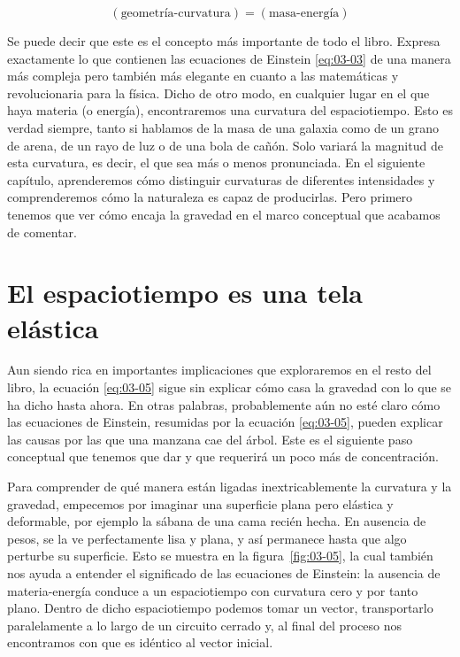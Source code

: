 \begin{equation}\label{eq:03-05}
(\text{geometría-curvatura}) = (\text{masa-energía})
\end{equation}


Se puede decir que este es el concepto más importante de todo el libro. Expresa exactamente lo
que contienen las ecuaciones de Einstein \eqref{eq:03-03} de una manera más compleja pero
también más elegante en cuanto a las matemáticas y revolucionaria para la física. Dicho de otro
modo, en cualquier lugar en el que haya materia (o energía), encontraremos una curvatura del
espaciotiempo. Esto es verdad siempre, tanto si hablamos de la masa de una galaxia como de un
grano de arena, de un rayo de luz o de una bola de cañón. Solo variará la magnitud de esta
curvatura, es decir, el que sea más o menos pronunciada. En el siguiente capítulo, aprenderemos
cómo distinguir curvaturas de diferentes intensidades y comprenderemos cómo la naturaleza es
capaz de producirlas. Pero primero tenemos que ver cómo encaja la gravedad en el marco
conceptual que acabamos de comentar.

\section{El espaciotiempo es una tela elástica}\label{sec:03-fabric}

Aun siendo rica en importantes implicaciones que exploraremos en el resto del libro, la
ecuación \eqref{eq:03-05} sigue sin explicar cómo casa la gravedad con lo que se ha dicho hasta
ahora. En otras palabras, probablemente aún no esté claro cómo las ecuaciones de Einstein,
resumidas por la ecuación \eqref{eq:03-05}, pueden explicar las causas por las que una manzana
cae del árbol. Este es el siguiente paso conceptual que tenemos que dar y que requerirá un poco
más de concentración.

Para comprender de qué manera están ligadas inextricablemente la curvatura y la gravedad,
empecemos por imaginar una superficie plana pero elástica y deformable, por ejemplo la sábana
de una cama recién hecha. En ausencia de pesos, se la ve perfectamente lisa y plana, y así
permanece hasta que algo perturbe su superficie. Esto se muestra en la figura~\ref{fig:03-05},
la cual también nos ayuda a entender el significado de las ecuaciones de Einstein: la ausencia
de materia-energía conduce a un espaciotiempo con curvatura cero y por tanto plano. Dentro de
dicho espaciotiempo podemos tomar un vector, transportarlo paralelamente a lo largo de un
circuito cerrado y, al final del proceso nos encontramos con que es idéntico al vector inicial.

